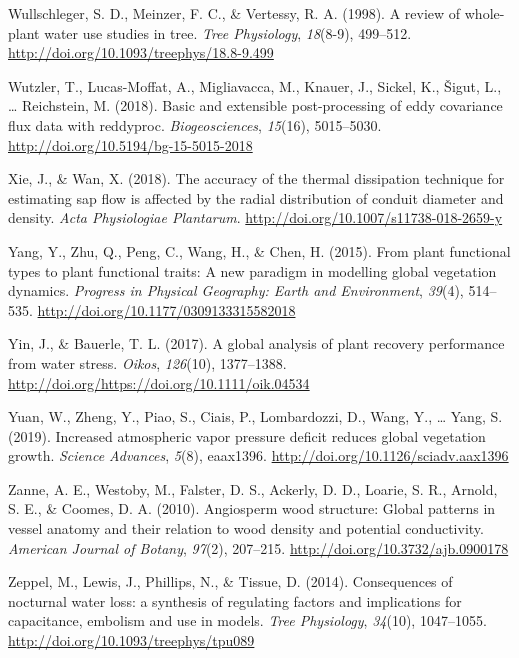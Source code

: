 \documentclass[11pt,twoside]{reedthesis}
\begin{document}
\hypertarget{ref-Wullschleger1998}{}
Wullschleger, S. D., Meinzer, F. C., \& Vertessy, R. A. (1998). A review
of whole-plant water use studies in tree. \emph{Tree Physiology},
\emph{18}(8-9), 499--512.
\url{http://doi.org/10.1093/treephys/18.8-9.499}

\hypertarget{ref-Wutzler2018}{}
Wutzler, T., Lucas-Moffat, A., Migliavacca, M., Knauer, J., Sickel, K.,
Šigut, L., \ldots{} Reichstein, M. (2018). Basic and extensible
post-processing of eddy covariance flux data with reddyproc.
\emph{Biogeosciences}, \emph{15}(16), 5015--5030.
\url{http://doi.org/10.5194/bg-15-5015-2018}

\hypertarget{ref-Xie2018}{}
Xie, J., \& Wan, X. (2018). The accuracy of the thermal dissipation
technique for estimating sap flow is affected by the radial distribution
of conduit diameter and density. \emph{Acta Physiologiae Plantarum}.
\url{http://doi.org/10.1007/s11738-018-2659-y}

\hypertarget{ref-Yang2015}{}
Yang, Y., Zhu, Q., Peng, C., Wang, H., \& Chen, H. (2015). From plant
functional types to plant functional traits: A new paradigm in modelling
global vegetation dynamics. \emph{Progress in Physical Geography: Earth
and Environment}, \emph{39}(4), 514--535.
\url{http://doi.org/10.1177/0309133315582018}

\hypertarget{ref-Yin2017}{}
Yin, J., \& Bauerle, T. L. (2017). A global analysis of plant recovery
performance from water stress. \emph{Oikos}, \emph{126}(10), 1377--1388.
\url{http://doi.org/https://doi.org/10.1111/oik.04534}

\hypertarget{ref-yuan_increased_2019}{}
Yuan, W., Zheng, Y., Piao, S., Ciais, P., Lombardozzi, D., Wang, Y.,
\ldots{} Yang, S. (2019). Increased atmospheric vapor pressure deficit
reduces global vegetation growth. \emph{Science Advances}, \emph{5}(8),
eaax1396. \url{http://doi.org/10.1126/sciadv.aax1396}

\hypertarget{ref-Zanne2010}{}
Zanne, A. E., Westoby, M., Falster, D. S., Ackerly, D. D., Loarie, S.
R., Arnold, S. E., \& Coomes, D. A. (2010). Angiosperm wood structure:
Global patterns in vessel anatomy and their relation to wood density and
potential conductivity. \emph{American Journal of Botany}, \emph{97}(2),
207--215. \url{http://doi.org/10.3732/ajb.0900178}

\hypertarget{ref-Zeppel2014}{}
Zeppel, M., Lewis, J., Phillips, N., \& Tissue, D. (2014). Consequences
of nocturnal water loss: a synthesis of regulating factors and
implications for capacitance, embolism and use in models. \emph{Tree
Physiology}, \emph{34}(10), 1047--1055.
\url{http://doi.org/10.1093/treephys/tpu089}
\end{document}

